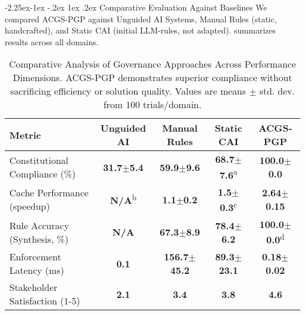 \documentclass[manuscript,screen,9pt]{acmart}
\makeatletter
\renewcommand\subsection{\@startsection{subsection}{2}{\z@}%
  {-2.25ex\@plus -1ex \@minus -.2ex}%
  {1ex \@plus .2ex}%
  {\normalfont\large\bfseries}}
\newcommand{\tablesize}{\footnotesize}
\newcommand{\tablenumfmt}[1]{\textbf{#1}}
\newcommand{\tableheader}[1]{\textbf{#1}}
\makeatother
\begin{document}
\subsection{Comparative Evaluation Against Baselines}
\label{subsec:comparative_evaluation}
We compared ACGS-PGP against Unguided AI Systems, Manual Rules (static, handcrafted), and Static CAI (initial LLM-rules, not adapted).  summarizes results across all domains.
\begin{table}[htbp]
\centering
\caption{Comparative Analysis of Governance Approaches Across Performance Dimensions. ACGS-PGP demonstrates superior compliance without sacrificing efficiency or solution quality. Values are means $\pm$ std. dev. from 100 trials/domain.}
\label{tab:baseline_comparison}
\tablesize
\begin{tabular}{@{}lcccc@{}}
\toprule
\tableheader{Metric} & \tableheader{Unguided AI} & \tableheader{Manual Rules} & \tableheader{Static CAI} & \tableheader{ACGS-PGP} \\
\midrule
Constitutional Compliance (\%) & \tablenumfmt{31.7$\pm$5.4} & \tablenumfmt{59.9$\pm$9.6} & \tablenumfmt{68.7$\pm$7.6}\textsuperscript{a} & \textbf{\tablenumfmt{100.0$\pm$0.0}} \\
Cache Performance (speedup) & \tablenumfmt{N/A}\textsuperscript{b} & \tablenumfmt{1.1$\pm$0.2} & \tablenumfmt{1.5$\pm$0.3}\textsuperscript{c} & \textbf{\tablenumfmt{2.64$\pm$0.15}} \\
Rule Accuracy (Synthesis, \%) & \tablenumfmt{N/A} & \tablenumfmt{67.3$\pm$8.9} & \tablenumfmt{78.4$\pm$6.2} & \textbf{\tablenumfmt{100.0$\pm$0.0}}\textsuperscript{d} \\
Enforcement Latency (ms) & \tablenumfmt{0.1} & \tablenumfmt{156.7$\pm$45.2} & \tablenumfmt{89.3$\pm$23.1} & \textbf{\tablenumfmt{0.18$\pm$0.02}} \\
Stakeholder Satisfaction (1-5) & \tablenumfmt{2.1} & \tablenumfmt{3.4} & \tablenumfmt{3.8} & \textbf{\tablenumfmt{4.6}} \\
\bottomrule
\end{tabular}

\end{table}
\end{document}
